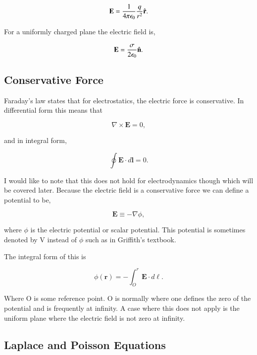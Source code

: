\documentclass[preprint, review,12pt]{elsarticle}
\def\x{\times}
\def\.{\cdot}
\def\b{\textbf}
\def\bell{\bm{\ell}}
\def\={\equiv}
\begin{document}
\begin{equation}
    \b{E}= \frac{1}{4 \pi \epsilon_0} \frac{q}{r^2}\hat{\b r}.
\end{equation}

For a uniformly charged plane the electric field is,

\begin{equation}
    \b{E} = \frac{\sigma}{2\epsilon_0}\hat{\b n}.
\end{equation}

\subsection{Conservative Force}

Faraday's law states that for electrostatics, the electric force is conservative. In differential form this means that

\begin{equation}
    \nabla \x \b{E} = 0,
\end{equation}

and in integral form,

\begin{equation}
    \oint \b{E} \. d\b{l} = 0.
\end{equation}

I would like to note that this does not hold for electrodynamics though which will be covered later. Because the electric field is a conservative force we can define a potential to be,

\begin{equation}
    \b{E} \= -\nabla \phi,
\end{equation}

where $\phi$ is the electric potential or scalar potential. This potential is sometimes denoted by V instead of $\phi$ such as in Griffith's textbook.

The integral form of this is

\begin{equation}
    \phi(\b{r}) = - \int_O^r \b{E}\. d \bell.
\end{equation}

Where O is some reference point. O is normally where one defines the zero of the potential and is frequently at infinity. A case where this does not apply is the uniform plane where the electric field is not zero at infinity. 

\subsection{Laplace and Poisson Equations}
\end{document}
